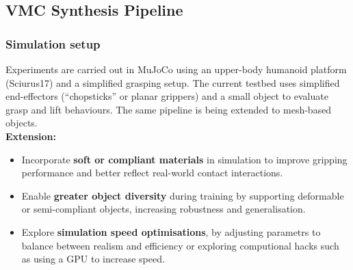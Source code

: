 \documentclass[12pt,a4paper,twocolumn]{article}
\begin{document}




\subsection{VMC Synthesis Pipeline}
\subsubsection{Simulation setup}
Experiments are carried out in MuJoCo using an upper-body humanoid platform (Sciurus17) and a simplified grasping setup. The current testbed uses simplified end-effectors (``chopsticks'' or planar grippers) and a small object to evaluate grasp and lift behaviours. The same pipeline is being extended to mesh-based objects. \\
\textbf{Extension:} 
\begin{itemize}
    \item Incorporate \textbf{soft or compliant materials} in simulation to improve gripping performance and better reflect real-world contact interactions.
    \item Enable \textbf{greater object diversity} during training by supporting deformable or semi-compliant objects, increasing robustness and generalisation.
    \item Explore \textbf{simulation speed optimisations}, by adjusting parametrs to balance between realism and efficiency or exploring computional hacks such as using a GPU to increase speed.
\end{itemize}
\end{document}
